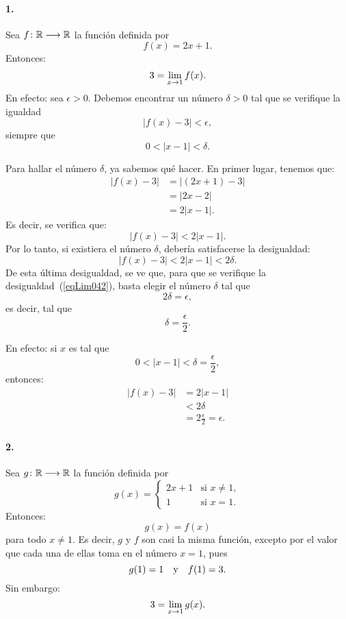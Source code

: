 \paragraph{1.}Sea $\funcjc{f}{\mathbb{R}}{\mathbb{R}}$ la función definida por
\[
f(x) = 2x + 1.
\]
Entonces:
\[
3 = \limjc{f(x)}{x}{1}.
\]
En efecto: sea $\epsilon > 0$. Debemos encontrar un número $\delta > 0$ tal que se verifique la
igualdad
\begin{equation}
\label{eqLim042}
|f(x) - 3| < \epsilon,
\end{equation}
siempre que
\[
0 < |x - 1| < \delta.
\]

Para hallar el número $\delta$, ya sabemos qué hacer. En primer lugar, tenemos que:
\begin{align*}
|f(x) - 3| &= |(2x + 1) - 3| \\
&= |2x - 2| \\
&= 2|x - 1|.
\end{align*}
Es decir, se verifica que:
\begin{equation*}
|f(x) - 3| < 2|x-1|.
\end{equation*}
Por lo tanto, si existiera el número $\delta$, debería satisfacerse la desigualdad:
\begin{equation*}
|f(x) - 3| < 2|x-1| < 2\delta.
\end{equation*}
De esta última desigualdad, se ve que, para que se verifique la desigualdad~(\ref{eqLim042}), basta
elegir el número $\delta$ tal que
\[
2\delta = \epsilon,
\]
es decir, tal que
\[
\delta = \frac{\epsilon}{2}.
\]

En efecto: si $x$ es tal que
\[
0 < |x - 1| < \delta = \frac{\epsilon}{2},
\]
entonces:
\begin{align*}
|f(x) - 3| &= 2|x - 1| \\
&< 2\delta \\
&= 2\frac{\epsilon}{2} = \epsilon.
\end{align*}

\paragraph{2.} Sea $\funcjc{g}{\mathbb{R}}{\mathbb{R}}$ la función definida por
\[
g(x) =
\begin{cases}
2x + 1 & \text{si } x\neq 1, \\
1 & \text{si } x = 1.
\end{cases}
\]
Entonces:
\[
g(x) = f(x)
\]
para todo $x\neq 1$. Es decir, $g$ y $f$ son casi la misma función, excepto por el valor que cada
una de ellas toma en el número $x = 1$, pues
\[
g(1) = 1\yjc f(1) = 3.
\]
Sin embargo:
\[
3 = \limjc{g(x)}{x}{1}.
\]


